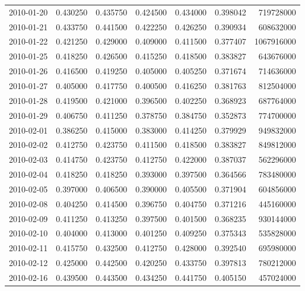 \begin{tabular}{lrrrrrr}
2010-01-20 &    0.430250 &    0.435750 &    0.424500 &    0.434000 &    0.398042 &   719728000 \\
2010-01-21 &    0.433750 &    0.441500 &    0.422250 &    0.426250 &    0.390934 &   608632000 \\
2010-01-22 &    0.421250 &    0.429000 &    0.409000 &    0.411500 &    0.377407 &  1067916000 \\
2010-01-25 &    0.418250 &    0.426500 &    0.415250 &    0.418500 &    0.383827 &   643676000 \\
2010-01-26 &    0.416500 &    0.419250 &    0.405000 &    0.405250 &    0.371674 &   714636000 \\
2010-01-27 &    0.405000 &    0.417750 &    0.400500 &    0.416250 &    0.381763 &   812504000 \\
2010-01-28 &    0.419500 &    0.421000 &    0.396500 &    0.402250 &    0.368923 &   687764000 \\
2010-01-29 &    0.406750 &    0.411250 &    0.378750 &    0.384750 &    0.352873 &   774700000 \\
2010-02-01 &    0.386250 &    0.415000 &    0.383000 &    0.414250 &    0.379929 &   949832000 \\
2010-02-02 &    0.412750 &    0.423750 &    0.411500 &    0.418500 &    0.383827 &   849812000 \\
2010-02-03 &    0.414750 &    0.423750 &    0.412750 &    0.422000 &    0.387037 &   562296000 \\
2010-02-04 &    0.418250 &    0.418250 &    0.393000 &    0.397500 &    0.364566 &   783480000 \\
2010-02-05 &    0.397000 &    0.406500 &    0.390000 &    0.405500 &    0.371904 &   604856000 \\
2010-02-08 &    0.404250 &    0.414500 &    0.396750 &    0.404750 &    0.371216 &   445160000 \\
2010-02-09 &    0.411250 &    0.413250 &    0.397500 &    0.401500 &    0.368235 &   930144000 \\
2010-02-10 &    0.404000 &    0.413000 &    0.401250 &    0.409250 &    0.375343 &   535828000 \\
2010-02-11 &    0.415750 &    0.432500 &    0.412750 &    0.428000 &    0.392540 &   695980000 \\
2010-02-12 &    0.425000 &    0.442500 &    0.420250 &    0.433750 &    0.397813 &   780212000 \\
2010-02-16 &    0.439500 &    0.443500 &    0.434250 &    0.441750 &    0.405150 &   457024000 \\

\end{tabular}
